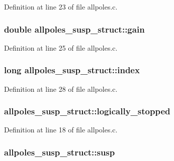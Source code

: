 Definition at line 23 of file allpoles.\+c.

\subsubsection[{\texorpdfstring{gain}{gain}}]{\setlength{\rightskip}{0pt plus 5cm}double allpoles\+\_\+susp\+\_\+struct\+::gain}\hypertarget{structallpoles__susp__struct_a365ab08384c35bab89ff00481a43f3b2}{}\label{structallpoles__susp__struct_a365ab08384c35bab89ff00481a43f3b2}


Definition at line 25 of file allpoles.\+c.

\subsubsection[{\texorpdfstring{index}{index}}]{\setlength{\rightskip}{0pt plus 5cm}long allpoles\+\_\+susp\+\_\+struct\+::index}\hypertarget{structallpoles__susp__struct_ac4c43a32b570fe7b76d070a836a5f851}{}\label{structallpoles__susp__struct_ac4c43a32b570fe7b76d070a836a5f851}


Definition at line 28 of file allpoles.\+c.

\subsubsection[{\texorpdfstring{logically\+\_\+stopped}{logically_stopped}}]{ allpoles\+\_\+susp\+\_\+struct\+::logically\+\_\+stopped}\hypertarget{structallpoles__susp__struct_a7bbede0decbc7893b76293aeabc465bd}{}\label{structallpoles__susp__struct_a7bbede0decbc7893b76293aeabc465bd}


Definition at line 18 of file allpoles.\+c.

\subsubsection[{\texorpdfstring{susp}{susp}}]{ allpoles\+\_\+susp\+\_\+struct\+::susp}\hypertarget{structallpoles__susp__struct_a9362e843e7e4cc86704db769e4b7a0ae}{}\label{structallpoles__susp__struct_a9362e843e7e4cc86704db769e4b7a0ae}


